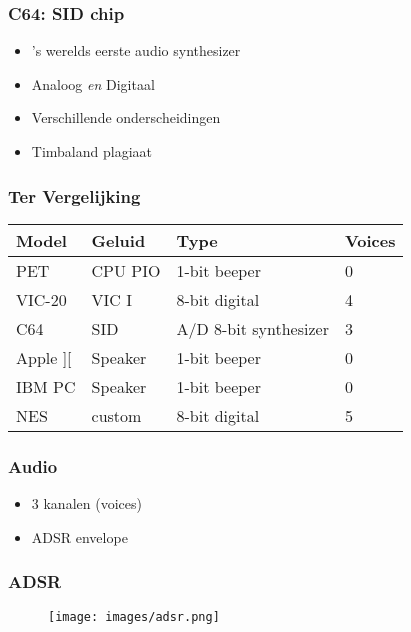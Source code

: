 \documentclass[aspectratio=43]{uva-inf-presentation}
\begin{document}

\begin{frame}
\frametitle{C64: SID chip}

\begin{itemize}
\item 's werelds eerste audio synthesizer
\item Analoog \emph{en} Digitaal
\item Verschillende onderscheidingen
\item Timbaland plagiaat
\end{itemize}

\end{frame}


\begin{frame}
\frametitle{Ter Vergelijking}

\begin{tabular}{|l|l|l|l|}
\hline Model & Geluid & Type & Voices \\ \hline
PET & CPU PIO & 1-bit beeper & 0 \\
VIC-20 & VIC I & 8-bit digital & 4 \\
C64 & SID & A/D 8-bit synthesizer & 3 \\ \hline
Apple ][ & Speaker & 1-bit beeper & 0 \\
IBM PC & Speaker & 1-bit beeper & 0 \\
NES & custom & 8-bit digital & 5 \\ \hline
\end{tabular}

\end{frame}


\begin{frame}
\frametitle{Audio}

\begin{itemize}
\item 3 kanalen (voices)
\item ADSR envelope
\end{itemize}

\end{frame}


\begin{frame}
\frametitle{ADSR}

\begin{figure}
\texttt{[image: images/adsr.png]}
\end{figure}

\end{frame}
\end{document}
